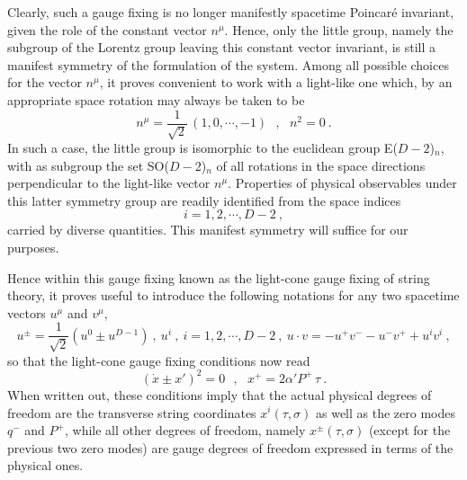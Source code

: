 \documentclass[a4paper,11pt]{article}
\begin{document}
Clearly, such a gauge fixing is no longer manifestly spacetime Poincar\'e
invariant, given the role of the constant vector $n^\mu$. Hence, only the
little group, namely the subgroup of the Lorentz group leaving this
constant vector in\-va\-riant, is still a manifest symmetry of the formulation
of the system. Among all possible choices for the vector $n^\mu$, it proves
convenient to work with a light-like one which, by an appropriate space
rotation may always be taken to be
\begin{equation}
n^\mu=\frac{1}{\sqrt{2}}\,(1,0,\cdots,-1)\ \ \ ,\ \ \ n^2=0\ .
\end{equation}
In such a case, the little group is isomorphic to the euclidean group
E($D-2$)$_n$, with as subgroup the set SO($D-2$)$_n$ of all rotations in the
space directions perpendicular to the light-like vector $n^\mu$. Properties
of physical observables under this latter symmetry group are readily 
identified from the space indices
\begin{equation}
i=1,2,\cdots,D-2\ ,
\end{equation}
carried by diverse quantities. This manifest symmetry will suffice for
our purposes.

Hence within this gauge fixing known as the light-cone gauge fixing
of string theory, it proves useful to introduce the following notations
for any two spacetime vectors $u^\mu$ and $v^\mu$,
\begin{equation}
u^\pm=\frac{1}{\sqrt{2}}\left(u^0\pm u^{D-1}\right)\ ,\ 
u^i\ ,\ i=1,2,\cdots,D-2\ ,\ 
u\cdot v=-u^+v^--u^-v^++u^iv^i\ ,
\end{equation}
so that the light-cone gauge fixing conditions now read
\begin{equation}
(\dot{x}\pm x')^2=0\ \ \ ,\ \ \ x^+=2\alpha' P^+\,\tau\ .
\end{equation}
When written out, these conditions imply that the actual physical degrees
of freedom are the transverse string coordinates $x^i(\tau,\sigma)$ as well
as the zero modes $q^-$ and $P^+$, while all other degrees of freedom,
namely $x^\pm(\tau,\sigma)$ (except for the previous two zero modes)
are gauge degrees of freedom expressed in terms of the physical ones.
\end{document}
